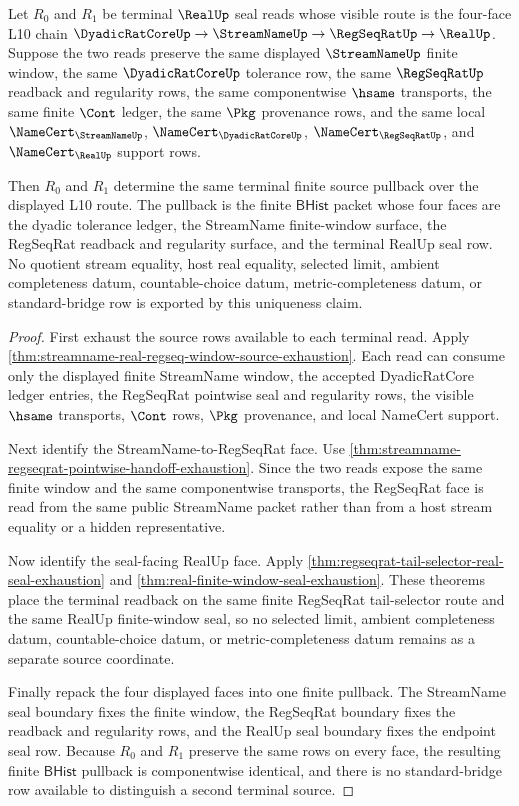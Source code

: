 \begin{theorem}
\label{thm:real-l10-terminal-source-pullback-uniqueness}
Let $R_0$ and $R_1$ be terminal $\RealUp$ seal reads whose visible route is the
four-face L10 chain
$\DyadicRatCoreUp \to \StreamNameUp \to \RegSeqRatUp \to \RealUp$. Suppose the
two reads preserve the same displayed $\StreamNameUp$ finite window, the same
$\DyadicRatCoreUp$ tolerance row, the same $\RegSeqRatUp$ readback and
regularity rows, the same componentwise $\hsame$ transports, the same finite
$\Cont$ ledger, the same $\Pkg$ provenance rows, and the same local
$\NameCert_{\StreamNameUp}$, $\NameCert_{\DyadicRatCoreUp}$,
$\NameCert_{\RegSeqRatUp}$, and $\NameCert_{\RealUp}$ support rows.

Then $R_0$ and $R_1$ determine the same terminal finite source pullback over the
displayed L10 route. The pullback is the finite $\mathsf{BHist}$ packet whose
four faces are the dyadic tolerance ledger, the StreamName finite-window
surface, the RegSeqRat readback and regularity surface, and the terminal RealUp
seal row. No quotient stream equality, host real equality, selected limit,
ambient completeness datum, countable-choice datum, metric-completeness datum,
or standard-bridge row is exported by this uniqueness claim.
\end{theorem}
\begin{proof}
First exhaust the source rows available to each terminal read. Apply
\autoref{thm:streamname-real-regseq-window-source-exhaustion}. Each read can
consume only the displayed finite StreamName window, the accepted
DyadicRatCore ledger entries, the RegSeqRat pointwise seal and regularity rows,
the visible $\hsame$ transports, $\Cont$ rows, $\Pkg$ provenance, and local
NameCert support.

Next identify the StreamName-to-RegSeqRat face. Use
\autoref{thm:streamname-regseqrat-pointwise-handoff-exhaustion}. Since the two
reads expose the same finite window and the same componentwise transports, the
RegSeqRat face is read from the same public StreamName packet rather than from
a host stream equality or a hidden representative.

Now identify the seal-facing RealUp face. Apply
\autoref{thm:regseqrat-tail-selector-real-seal-exhaustion} and
\autoref{thm:real-finite-window-seal-exhaustion}. These theorems place the
terminal readback on the same finite RegSeqRat tail-selector route and the same
RealUp finite-window seal, so no selected limit, ambient completeness datum,
countable-choice datum, or metric-completeness datum remains as a separate
source coordinate.

Finally repack the four displayed faces into one finite pullback. The
StreamName seal boundary fixes the finite window, the RegSeqRat boundary fixes
the readback and regularity rows, and the RealUp seal boundary fixes the
endpoint seal row. Because $R_0$ and $R_1$ preserve the same rows on every face,
the resulting finite $\mathsf{BHist}$ pullback is componentwise identical, and
there is no standard-bridge row available to distinguish a second terminal
source.
\end{proof}
